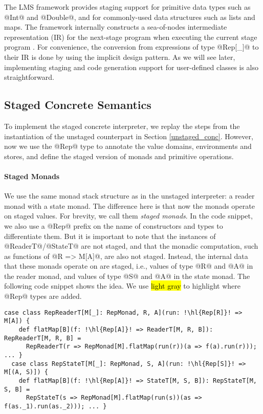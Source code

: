 The LMS framework provides staging support for primitive data types such as
@Int@ and @Double@, and for commonly-used data structures such as lists and
maps.  The framework internally constructs a sea-of-nodes intermediate
representation (IR) for the next-stage program when executing the current stage
program \cite{DBLP:conf/birthday/Rompf16}.
For convenience, the conversion from expressions of type @Rep[_]@ to their IR
is done by using the implicit design pattern. As we will see later,
implementing staging and code generation support for user-defined classes is
also straightforward.

\subsection{Staged Concrete Semantics}

To implement the staged concrete interpreter, we replay the steps from the
instantiation of the unstaged counterpart in Section \ref{unstaged_conc}.
However, now we use the @Rep@ type to annotate the value domains, environments and
stores, and define the staged version of monads and primitive operations.

\paragraph{Staged Monads}
We use the same monad stack structure as in the unstaged interpreter: a reader
monad with a state monad. The difference here is that now the monads operate
on staged values.  For brevity, we call them \textit{staged monads}. In the
code snippet, we also use a @Rep@ prefix on the name of constructors and types
to differentiate them.
But it is important to note that the instances of @ReaderT@/@StateT@ are not
staged, and that the monadic computation, such as functions of @R => M[A]@, are
also not staged. Instead, the internal data that these monads operate on are
staged, i.e., values of type @R@ and @A@ in the reader monad, and values of type @S@ and
@A@ in the state monad.
The following code snippet shows the idea. We use \hl{light gray} to highlight
where @Rep@ types are added.
\begin{lstlisting}[escapechar=!]
  case class RepReaderT[M[_]: RepMonad, R, A](run: !\hl{Rep[R]}! => M[A]) {
    def flatMap[B](f: !\hl{Rep[A]}! => ReaderT[M, R, B]): RepReaderT[M, R, B] =
      RepReaderT(r => RepMonad[M].flatMap(run(r))(a => f(a).run(r))); ... }
  case class RepStateT[M[_]: RepMonad, S, A](run: !\hl{Rep[S]}! => M[(A, S)]) {
    def flatMap[B](f: !\hl{Rep[A]}! => StateT[M, S, B]): RepStateT[M, S, B] =
      RepStateT(s => RepMonad[M].flatMap(run(s))(as => f(as._1).run(as._2))); ... }
\end{lstlisting}

